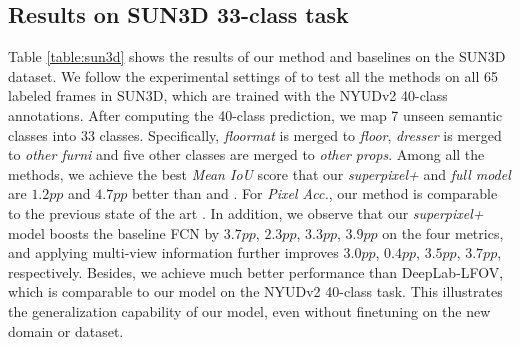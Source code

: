 \subsection{Results on SUN3D 33-class task}
\vspace{-0.15cm}
Table \ref{table:sun3d} shows the results of our method and baselines on the SUN3D dataset.
We follow the experimental settings of \cite{deng2015semantic} to test all the methods \cite{deng2015semantic,crfasrnn_iccv2015,chen2014semantic,chen2016deeplab,raghudeep2015spCNN,region_end2end2016eccv,long2015fully} on all 65 labeled frames in SUN3D,
which are trained with the NYUDv2 40-class annotations.
After computing the 40-class prediction, we map 7 unseen semantic classes into 33 classes.
Specifically, \textit{floormat} is merged to \textit{floor}, \textit{dresser} is merged to  \textit{other furni} and five other classes are merged to \textit{other  props}.
Among all the methods, we achieve the best \textit{Mean IoU} score that our \textit{superpixel+} and \textit{full model} are $1.2pp$ and $4.7pp$ better than \cite{deng2015semantic} and \cite{chen2016deeplab} .
For \textit{Pixel Acc.}, our method is comparable to the previous state of the art \cite{deng2015semantic}.
In addition, we observe that our \textit{superpixel+} model boosts the baseline FCN by $3.7pp$, $2.3pp$, $3.3pp$, $3.9pp$ on the four metrics, and applying multi-view information further improves $3.0pp$, $0.4pp$, $3.5pp$, $3.7pp$, respectively.
Besides, we achieve much better performance than DeepLab-LFOV, which is comparable to our model on the NYUDv2 40-class task.
This illustrates  the generalization capability of our model, even without finetuning on the new  domain or dataset.


